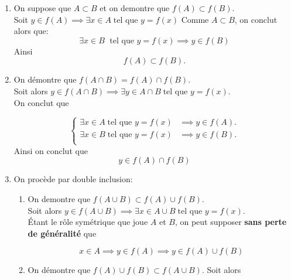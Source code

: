 \documentclass{report}
\begin{document}
\begin{myproof}
 \begin{enumerate}
   \item On suppose que $A\subset B$  et on demontre que  $f(A)\subset f(B)$.\\

     Soit $y\in f(A) \implies \exists x \in A \; \text{tel que } y = f(x)$
     Comme $A\subset B$, on conclut alors que:
     $$
     \exists x \in B\; \text{ tel que } y = f(x) \implies y \in f(B)
     $$
     Ainsi
     $$
     f(A) \subset f(B).
     $$
   \item On démontre que $f(A\cap B) = f(A)\cap f(B)$.\\

     Soit alors $y \in f(A\cap B) \implies \exists y \in A\cap B \;\text{tel que } y = f(x)$.\\

     On conclut que

     $$
     \begin{cases}
       \exists x \in A \; \text{tel que } y = f(x) &\implies y \in f(A). \\[4pt]

       \exists x \in B \; \text{tel que } y = f(x) &\implies y \in f(B). \\

     \end{cases}
     $$
     Ainsi on conclut que 
     $$
     y \in f(A) \cap f(B)
     $$

  \item  On procède par double inclusion:\\
    \begin{enumerate}
      \item On demontre que $f(A\cup B) \subset f(A)\cup f(B)$.\\

        Soit alors $y\in f(A\cup B) \implies \exists x \in A\cup B \; \text{tel
        que } y = f(x)$.\\

        Étant le rôle symétrique que joue $A$ et $B$, on peut supposer
        \textbf{sans perte de généralité} que 

        $$
        x\in A \implies y \in f(A) \implies y \in f(A)\cup f(B)
        $$

  \item On démontre que  $ f(A)\cup f(B) \subset f(A\cup B)$.
    Soit alors 


\end{enumerate}
\end{enumerate}
\end{myproof}
\end{document}
